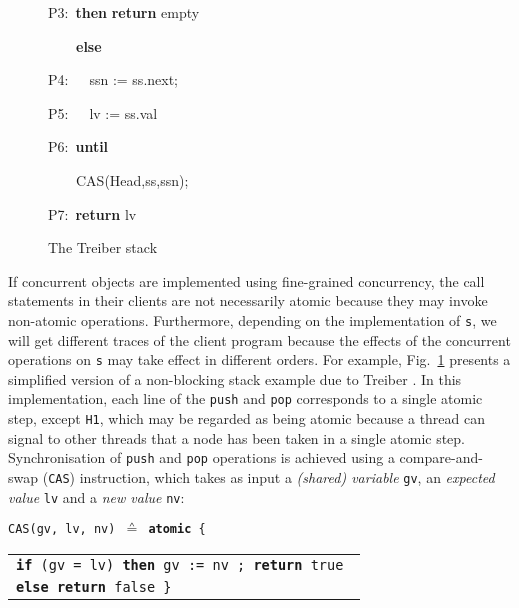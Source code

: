 \documentclass[11pt]{llncs}
\newcommand{\reffig}[1]{Fig.~\ref{#1}}
\begin{document}
\begin{figure}[t]
\begin{minipage}[b]{0.62\columnwidth}
\begin{minipage}[t]{0.49\columnwidth}
      P3:\ \textbf{then} 
 \textbf{return} empty
      
      \ \ \ \ \textbf{else} 


       P4:\ 
      \ \ ssn := ss.next;
      
       P5:\ 
      \ \ lv := ss.val
      
       P6:\ 
      \textbf{until} 
      
      \ \ \ \ CAS(Head,ss,ssn);
      
       P7:\ 
      \textbf{return} lv
    \end{minipage}
    \vspace{-2mm}
    \caption{The Treiber stack}
    \label{fig:TS}
  \end{minipage}
\vspace{-6mm}
\end{figure}

If concurrent objects are implemented using fine-grained concurrency, the
call statements in their clients are not necessarily atomic because they
may invoke non-atomic operations.  Furthermore, depending on the
implementation of {\tt s}, we will get different traces of the client
program because the effects of the concurrent operations on {\tt s} may
take effect in different orders.
For example, \reffig{fig:TS} presents a
simplified version of a non-blocking stack 
example due to Treiber \cite{Tre86}.
In this implementation, each line of the {\tt push} and {\tt pop}
corresponds to a single atomic step, except {\tt H1}, which may
be regarded as being atomic because a thread can signal to other
threads that a node has been taken in a single atomic
step. Synchronisation of {\tt push} and {\tt pop} operations is achieved
using a compare-and-swap (\texttt{CAS}) instruction, which takes as
input a \emph{(shared) variable} {\tt gv}, an \emph{expected value}
{\tt lv} and a \emph{new value} {\tt nv}:\smallskip

\begin{minipage}[t]{0.9\columnwidth}
  \small \tt CAS(gv, lv, nv) $\sdef$ \textbf{atomic} \{
  \begin{tabular}[t]{@{}l@{}}
    \tt \textbf{if} (gv = lv) 
    \tt \textbf{then} gv := nv ; \textbf{return} true \\
    \tt \textbf{else} \textbf{return} false \}
  \end{tabular}
\end{minipage}\smallskip
\end{document}
